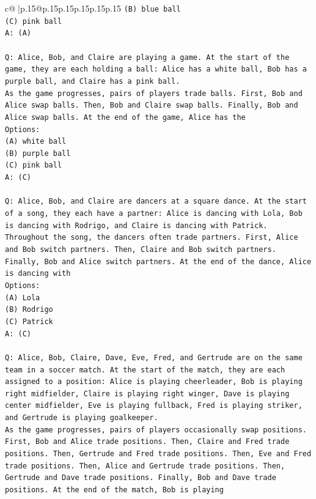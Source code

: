 \documentclass{article}
\begin{document}
{\begin{supertabular}{c@{$\;$}|p{.15\linewidth}@{}p{.15\linewidth}p{.15\linewidth}p{.15\linewidth}p{.15\linewidth}p{.15\linewidth}}
{{{\texttt{(B) blue ball} \\
\texttt{(C) pink ball} \\
\texttt{A: (A)} \\
\\ 
\texttt{Q: Alice, Bob, and Claire are playing a game. At the start of the game, they are each holding a ball: Alice has a white ball, Bob has a purple ball, and Claire has a pink ball.} \\
\texttt{As the game progresses, pairs of players trade balls. First, Bob and Alice swap balls. Then, Bob and Claire swap balls. Finally, Bob and Alice swap balls. At the end of the game, Alice has the} \\
\texttt{Options:} \\
\texttt{(A) white ball} \\
\texttt{(B) purple ball} \\
\texttt{(C) pink ball} \\
\texttt{A: (C)} \\
\\ 
\texttt{Q: Alice, Bob, and Claire are dancers at a square dance. At the start of a song, they each have a partner: Alice is dancing with Lola, Bob is dancing with Rodrigo, and Claire is dancing with Patrick.} \\
\texttt{Throughout the song, the dancers often trade partners. First, Alice and Bob switch partners. Then, Claire and Bob switch partners. Finally, Bob and Alice switch partners. At the end of the dance, Alice is dancing with} \\
\texttt{Options:} \\
\texttt{(A) Lola} \\
\texttt{(B) Rodrigo} \\
\texttt{(C) Patrick} \\
\texttt{A: (C)} \\
\\ 
\texttt{Q: Alice, Bob, Claire, Dave, Eve, Fred, and Gertrude are on the same team in a soccer match. At the start of the match, they are each assigned to a position: Alice is playing cheerleader, Bob is playing right midfielder, Claire is playing right winger, Dave is playing center midfielder, Eve is playing fullback, Fred is playing striker, and Gertrude is playing goalkeeper.} \\
\texttt{As the game progresses, pairs of players occasionally swap positions. First, Bob and Alice trade positions. Then, Claire and Fred trade positions. Then, Gertrude and Fred trade positions. Then, Eve and Fred trade positions. Then, Alice and Gertrude trade positions. Then, Gertrude and Dave trade positions. Finally, Bob and Dave trade positions. At the end of the match, Bob is playing} \\
}}}
\end{supertabular}}
\end{document}
